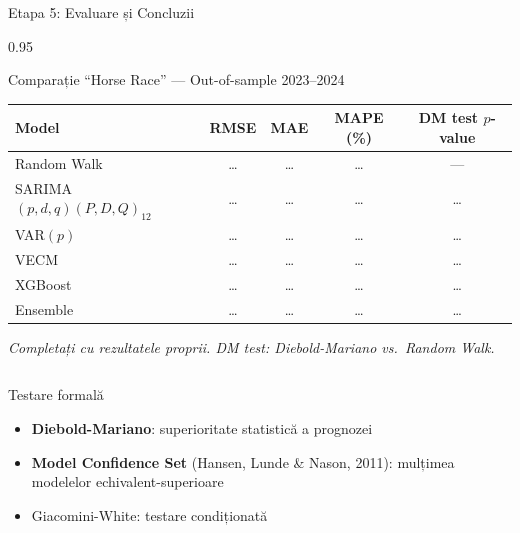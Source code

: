 \documentclass[9pt, aspectratio=169, t]{beamer}
\begin{document}
\begin{frame}{Etapa 5: Evaluare și Concluzii}
    \vspace{-0.3cm}
    \begin{cminipage}{0.95\textwidth}
        {\scriptsize
        \begin{block}{Comparație ``Horse Race'' --- Out-of-sample 2023--2024}
            \vspace{-0.1cm}
            \begin{center}
            \begin{tabular}{@{}l c c c c@{}}
                \toprule
                \textbf{Model} & \textbf{RMSE} & \textbf{MAE} & \textbf{MAPE (\%)} & \textbf{DM test $p$-value} \\
                \midrule
                Random Walk & \ldots & \ldots & \ldots & --- \\
                SARIMA$(p,d,q)(P,D,Q)_{12}$ & \ldots & \ldots & \ldots & \ldots \\
                VAR$(p)$ & \ldots & \ldots & \ldots & \ldots \\
                VECM & \ldots & \ldots & \ldots & \ldots \\
                XGBoost & \ldots & \ldots & \ldots & \ldots \\
                Ensemble & \ldots & \ldots & \ldots & \ldots \\
                \bottomrule
            \end{tabular}
            \end{center}
            \vspace{-0.2cm}
            \hfill{\tiny \textit{Completați cu rezultatele proprii. DM test: Diebold-Mariano vs.\ Random Walk.}}
        \end{block}
        }

        \vspace{-0.05cm}

        {\scriptsize
        \begin{columns}[T]
            \begin{exampleblock}{Testare formală}
                \begin{itemize}\setlength{\itemsep}{0pt}
                    \item \textbf{Diebold-Mariano}: superioritate statistică a prognozei
                    \item \textbf{Model Confidence Set} (Hansen, Lunde \& Nason, 2011): mulțimea modelelor echivalent-superioare
                    \item Giacomini-White: testare condiționată
                \end{itemize}
            \end{exampleblock}


\end{columns}}
\end{cminipage}
\end{frame}
\end{document}

